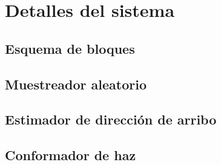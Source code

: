 \chapter{Detalles del sistema}\label{ch:sistema}

\section{Esquema de bloques}\label{subc:sistema_bloques}

\section{Muestreador aleatorio}\label{subc:sistema_randomsampler}

\section{Estimador de dirección de arribo}\label{subc:sistema_doa_estimator}

\section{Conformador de haz}\label{subc:sistema_beamformer}



